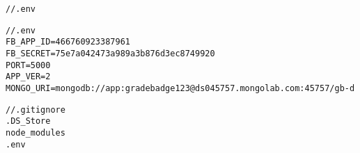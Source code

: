 \small
\lstset{basicstyle=\ttfamily,breaklines=true}
\begin{lstlisting}
//.env
\end{lstlisting}

\begin{lstlisting}
//.env
FB_APP_ID=466760923387961
FB_SECRET=75e7a042473a989a3b876d3ec8749920
PORT=5000
APP_VER=2
MONGO_URI=mongodb://app:gradebadge123@ds045757.mongolab.com:45757/gb-d
\end{lstlisting}

\begin{lstlisting}
//.gitignore
.DS_Store
node_modules
.env
\end{lstlisting}
